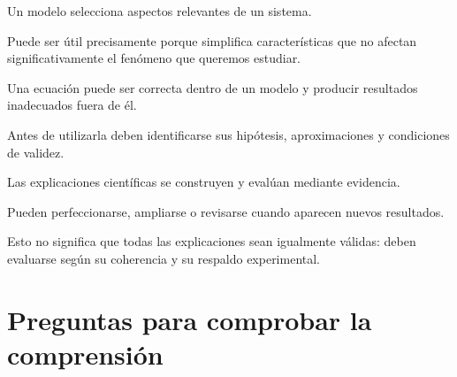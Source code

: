 \begin{errorfrecuente}

Un modelo selecciona aspectos
relevantes de un sistema.

Puede ser útil precisamente
porque simplifica características
que no afectan significativamente
el fenómeno que queremos estudiar.

\end{errorfrecuente}

\begin{errorfrecuente}

Una ecuación puede ser correcta
dentro de un modelo y producir
resultados inadecuados fuera de él.

Antes de utilizarla deben identificarse
sus hipótesis, aproximaciones
y condiciones de validez.

\end{errorfrecuente}

\begin{errorfrecuente}

Las explicaciones científicas
se construyen y evalúan
mediante evidencia.

Pueden perfeccionarse,
ampliarse o revisarse
cuando aparecen nuevos resultados.

Esto no significa que todas
las explicaciones sean igualmente
válidas: deben evaluarse
según su coherencia
y su respaldo experimental.

\end{errorfrecuente}


\section{Preguntas para comprobar la comprensión}

